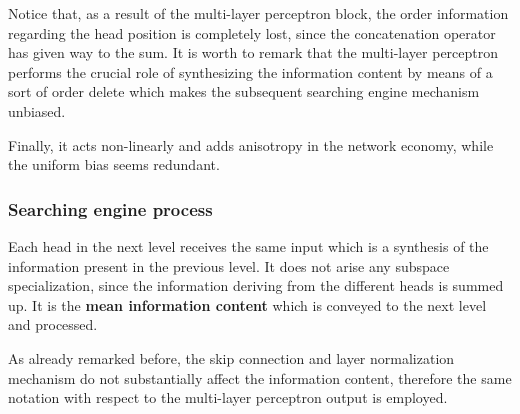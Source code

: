 \documentclass[11pt,a4paper,reqno]{amsart} %
\theoremstyle{definition}
\numberwithin{equation}{section}          %
\begin{document}
Notice that, as a result of the multi-layer perceptron block, the order information regarding the head position is completely lost, since the concatenation operator has given way to the sum. It is worth to remark that the multi-layer perceptron performs the crucial role of synthesizing the information content by means of a sort of order delete which makes the subsequent searching engine mechanism unbiased. 

Finally, it acts non-linearly and adds anisotropy in the network economy, while the uniform bias seems redundant.

\subsubsection{Searching engine process}

Each head in the next level receives the same input which is a synthesis of the information present in the previous level. It does not arise any subspace specialization, since the information deriving from the different heads is summed up. It is the \textbf{mean information content} which is conveyed to the next level and processed.

As already remarked before, the skip connection and layer normalization mechanism do not substantially affect the information content, therefore the same notation with respect to the multi-layer perceptron output is employed.
\end{document}
